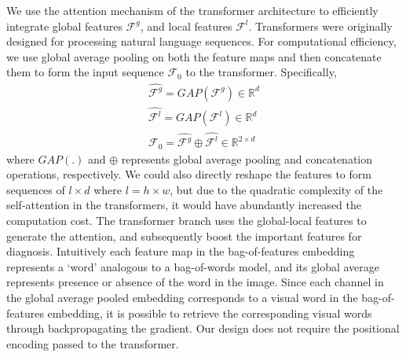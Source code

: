 %
We use the attention mechanism of the transformer architecture \cite{dosovitskiy2020image, vaswani2017attention} to efficiently integrate global features $\mathcal{F}^g$, and local features $\mathcal{F}^l$. Transformers were originally designed for processing natural language sequences. For computational efficiency, we use global average pooling on both the feature maps and then concatenate them to form the input sequence $\mathcal{F}_0$ to the transformer. Specifically, 
\begin{align}
    \hat{\mathcal{F}^g} = GAP(\mathcal{F}^g) \in \mathbb{R}^{d} \\
    \hat{\mathcal{F}^l} = GAP(\mathcal{F}^l) \in \mathbb{R}^{d} \\
    \mathcal{F}_0 = \hat{\mathcal{F}^g} \oplus \hat{\mathcal{F}^l} \in \mathbb{R}^{2\times d}
\end{align}
where $GAP(.)$ and $\oplus$ represents global average pooling and concatenation operations, respectively. We could also directly reshape the features to form sequences of $l \times d$ where $l=h \times w$, but due to the quadratic complexity of the self-attention in the transformers, it would have abundantly increased the computation cost. The transformer branch uses the global-local features to generate the attention, and subsequently boost the important features for diagnosis. Intuitively each feature map in the bag-of-features embedding represents a `word' analogous to a bag-of-words model, and its global average represents presence or absence of the word in the image. Since each channel in the global average pooled embedding corresponds to a visual word in the bag-of-features embedding, it is possible to retrieve the corresponding visual words through backpropagating the gradient. Our design does not require the positional encoding passed to the transformer.  

